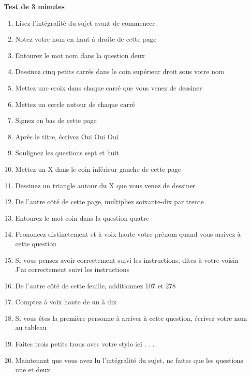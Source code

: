 \documentclass[pdftex,a4paper,12pt]{article}
\begin{document}
\textbf{Test de 3 minutes}
\begin{enumerate}
	\item Lisez l'intégralité du sujet avant de commencer
	\item Notez votre nom en haut à droite de cette page
	\item Entourez le mot \og{}nom\fg{} dans la question deux
	\item Dessinez cinq petits carrés dans le coin supérieur droit sous votre nom
	\item Mettez une croix dans chaque carré que vous venez de dessiner
	\item Mettez un cercle autour de chaque carré
	\item Signez en bas de cette page
	\item Après le titre, écrivez \og{}Oui Oui Oui\fg{}
	\item Soulignez les questions sept et huit
	\item Mettez un X dans le coin inférieur gauche de cette page
	\item Dessinez un triangle autour du X que vous venez de dessiner
	\item De l'autre côté de cette page, multipliez soixante-dix par trente
	\item Entourez le mot \og{}coin\fg{} dans la question quatre
	\item Prononcez distinctement et à voix haute votre prénom quand vous arrivez à cette question
	\item Si vous pensez avoir correctement suivi les instructions, dites à votre voisin \og{}J'ai correctement suivi les instructions\fg{}
	\item De l'autre côté de cette feuille, additionnez 107 et 278
	\item Comptez à voix haute de un à dix
	\item Si vous êtes la première personne à arriver à cette question, écrivez votre nom au tableau
	\item Faites trois petits trous avec votre stylo ici . . .
	\item Maintenant que vous avez lu l'intégralité du sujet, ne faites que les questions une et deux
\end{enumerate}
\end{document}
